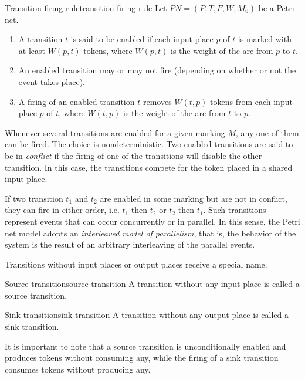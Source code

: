 \documentclass[../Thesis.tex]{subfiles}
\begin{document}
\begin{definition}{Transition firing rule}{transition-firing-rule}
    Let $ PN = (P, T, F, W, M_{0}) $ be a Petri net.
    \begin{enumerate}[label=(\roman*)]
        \item A transition $t$ is said to be enabled if each input place $p$ of $t$
              is marked with at least $W(p, t)$ tokens, where $W(p,t)$ is the weight of the arc from $p$ to $t$.
        \item An enabled transition may or may not fire (depending on whether or not the event takes place).
        \item A firing of an enabled transition $t$ removes $W(t,p)$ tokens from each input place $p$ of $t$,
              where $W(t, p)$ is the weight of the arc from $t$ to $p$.
    \end{enumerate}
\end{definition}

Whenever several transitions are enabled for a given marking $M$,
any one of them can be fired.
The choice is nondeterministic.
Two enabled transitions are said to be in \emph{conflict}
if the firing of one of the transitions will disable the other transition.
In this case, the transitions compete for the token placed in a shared input place.

If two transition $t_1$ and $t_2$ are enabled in some marking but are not in conflict,
they can fire in either order, i.e. $t_1$ then $t_2$ or $t_2$ then $t_1$.
Such transitions represent events that can occur concurrently or in parallel.
In this sense, the Petri net model adopts an \emph{interleaved model of parallelism}, that is,
the behavior of the system is the result of an arbitrary interleaving of the parallel events.

Transitions without input places or output places receive a special name.

\begin{definition}{Source transition}{source-transition}
    A transition without any input place is called a source transition.
\end{definition}

\begin{definition}{Sink transition}{sink-transition}
    A transition without any output place is called a sink transition.
\end{definition}

It is important to note that a source transition is unconditionally enabled
and produces tokens without consuming any, while the firing of a sink transition
consumes tokens without producing any.
\end{document}
